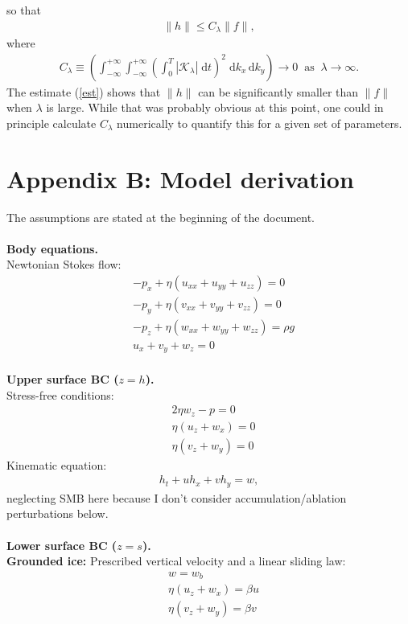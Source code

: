 \documentclass[paper=a4, fontsize=11pt]{article}
\begin{document}
so that
\begin{align}
\|h\| \leq C_\lambda \|{f}\|, \label{est}
\end{align}
where
\begin{align*}
C_\lambda \equiv \left(\int_{-\infty}^{+\infty}\int_{-\infty}^{+\infty}\left(\int_0^T |\mathcal{K}_\lambda| \;\mathrm{d}t\right)^2 \;\mathrm{d}k_x\,\mathrm{d}k_y \right)\to 0 \;\; \text{as} \;\;\lambda\to\infty.
\end{align*}
The estimate (\ref{est}) shows that $\|{h}\|$ can be significantly smaller
than $\|f\|$ when $\lambda$ is large. While that was probably obvious
at this point, one could in principle calculate $C_\lambda $ numerically
to quantify this for a given set of parameters.

\section*{Appendix B: Model derivation}
The assumptions are stated at the beginning of the document.\\ \\
\noindent\textbf{Body equations.}\\
Newtonian Stokes flow:
\begin{align}
&-p_x + \eta ( u_{xx} +u_{yy} + u_{zz}) = 0  \\
&-p_y + \eta ( v_{xx}+v_{yy} + v_{zz}) = 0 \\
&-p_z + \eta ( w_{xx} +w_{yy} + w_{zz}) = \rho g \\
&u_x + v_y + w_z = 0
\end{align}
\\
\noindent\textbf{Upper surface BC ($z=h$).}\\
Stress-free conditions:
\begin{align}
&2\eta w_z - p = 0 \\
&\eta(u_z +w_x) = 0 \\
&\eta(v_z +w_y) = 0
\end{align}
Kinematic equation:
\begin{align}
h_t + uh_x + vh_y = w,
\end{align}
neglecting SMB here because I don't consider accumulation/ablation perturbations below.
\\  \\
\noindent\textbf{Lower surface BC ($z=s$).}\\
\textbf{Grounded ice:}
Prescribed vertical velocity and a linear sliding law:
\begin{align}
&w  = w_b\\
&\eta(u_z + w_x) = \beta u \label{sl1} \\
&\eta(v_z + w_y) = \beta v \label{sl2}
\end{align}
\end{document}
